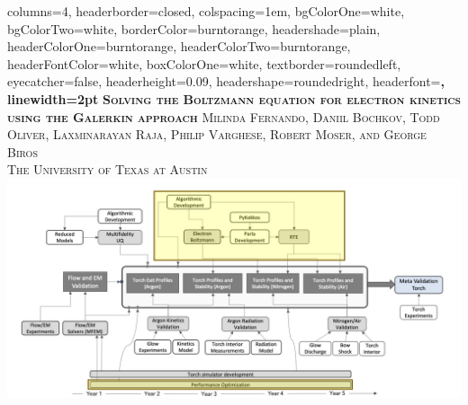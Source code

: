 \documentclass[landscape,archE,fontscale=0.285]{baposter} %
\begin{document}
\begin{poster}
{
columns=4, %
headerborder=closed, %
colspacing=1em, %
bgColorOne=white, %
bgColorTwo=white, %
borderColor=burntorange, %
headershade=plain,
headerColorOne=burntorange, %
headerColorTwo=burntorange, %
headerFontColor=white, %
boxColorOne=white, %
textborder=roundedleft, %
eyecatcher=false, %
headerheight=0.09\textheight, %
headershape=roundedright, %
headerfont=\Large\bf\textsc, %
linewidth=2pt %
}
%
{}
{\bf\textsc{Solving the Boltzmann equation for electron kinetics using the Galerkin approach}\vspace{0.01em}} %
{\textsc{\small Milinda Fernando, Daniil Bochkov, Todd Oliver, Laxminarayan Raja, Philip Varghese, Robert Moser, and George Biros \hspace{12pt} \\The University of Texas at Austin}} %
{\includegraphics[align=c,height=0.09\textheight]{road_map.png}%
}
\end{poster}
\end{document}

